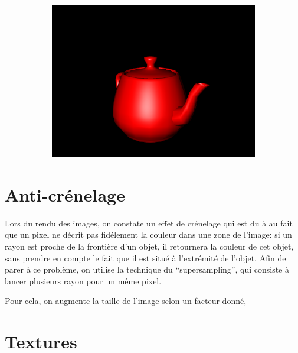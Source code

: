 \documentclass{article}
\begin{document}
\begin{figure}[hb]
  \begin{subfigure}{0.45\textwidth}
    \includegraphics[width=1\textwidth]{images/nres1.png}
  \end{subfigure}

\end{figure}

\section{Anti-crénelage}

Lors du rendu des images, on constate un effet de crénelage qui est du à au
fait que un pixel ne décrit pas fidélement la couleur dans une zone de l'image:
si un rayon est proche de la frontière d'un objet, il retournera la couleur de
cet objet, sans prendre en compte le fait que il est situé à l'extrémité de
l'objet. Afin de parer à ce problème, on utilise la technique du
``supersampling'', qui consiste à lancer plusieurs rayon pour un même pixel.

Pour cela, on augmente la taille de l'image selon un facteur donné,

\section{Textures}
\end{document}
